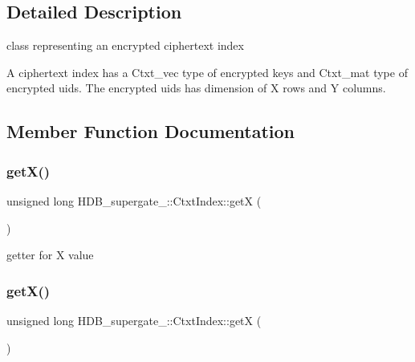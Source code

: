 \subsection{Detailed Description}
class representing an encrypted ciphertext index 

A ciphertext index has a Ctxt\+\_\+vec type of encrypted keys and Ctxt\+\_\+mat type of encrypted uids. The encrypted uids has dimension of X rows and Y columns. 

\subsection{Member Function Documentation}
\mbox{\label{classHDB__supergate___1_1CtxtIndex_ad3ee6eaf8a48319e153f30a6914dc6a9}} 
\subsubsection{\texorpdfstring{get\+X()}{getX()}\hspace{0.1cm}{\footnotesize\ttfamily [1/2]}}
{\footnotesize\ttfamily unsigned long H\+D\+B\+\_\+supergate\+\_\+\+::\+Ctxt\+Index\+::getX (\begin{DoxyParamCaption}{ }\end{DoxyParamCaption})\hspace{0.3cm}{\ttfamily [inline]}}

getter for X value \mbox{\label{classHDB__supergate___1_1CtxtIndex_ad3ee6eaf8a48319e153f30a6914dc6a9}} 
\subsubsection{\texorpdfstring{get\+X()}{getX()}\hspace{0.1cm}{\footnotesize\ttfamily [2/2]}}
{\footnotesize\ttfamily unsigned long H\+D\+B\+\_\+supergate\+\_\+\+::\+Ctxt\+Index\+::getX (\begin{DoxyParamCaption}{ }\end{DoxyParamCaption})\hspace{0.3cm}{\ttfamily [inline]}}

